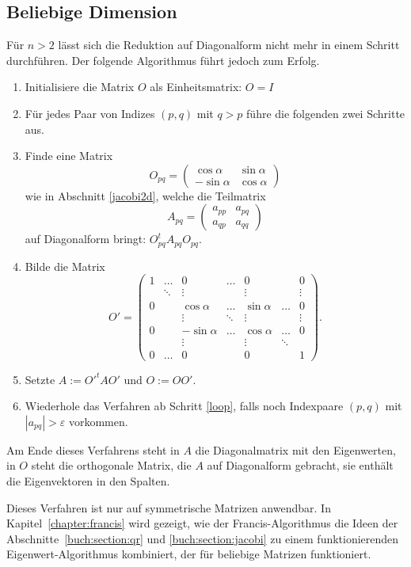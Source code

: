 \subsection{Beliebige Dimension}
Für $n>2$ lässt sich die Reduktion auf Diagonalform nicht mehr in einem
Schritt durchführen. Der folgende Algorithmus führt jedoch zum Erfolg.
\begin{enumerate}
\item Initialisiere die Matrix $O$ als Einheitsmatrix: $O=I$
\item \label{loop} Für jedes Paar von Indizes $(p,q)$ mit $q>p$ führe
die folgenden zwei Schritte aus.
\item Finde eine Matrix
\[
O_{pq}
=
\begin{pmatrix}
 \cos\alpha&\sin\alpha\\
-\sin\alpha&\cos\alpha
\end{pmatrix}
\]
wie in Abschnitt \ref{jacobi2d}, welche die Teilmatrix
\[
A_{pq}=\begin{pmatrix}a_{pp}&a_{pq}\\a_{qp}&a_{qq}\end{pmatrix}
\]
auf Diagonalform bringt: $O_{pq}^tA_{pq}O_{pq}$.
\item Bilde die Matrix
\[
O'=\begin{pmatrix}
1 &\dots &0         &\dots &0          &      &0\\
  &\ddots&\vdots    &      &\vdots     &      &\vdots\\
0 &      &\cos\alpha&\dots &\sin\alpha&\dots &0\\
  &      &\vdots    &\ddots&\vdots     &      &\vdots\\
0 &      &-\sin\alpha&\dots & \cos\alpha&\dots &0\\
  &      &\vdots    &      & \vdots    &\ddots& \\
0 &\dots &0         &      & 0         &      &1
\end{pmatrix}.
\]
\item Setzte $A:=O'^tAO'$ und $O:=OO'$.
\item Wiederhole das Verfahren ab Schritt \ref{loop}, falls noch Indexpaare
$(p,q)$ mit $|a_{pq}|>\varepsilon$ vorkommen.
\end{enumerate}
Am Ende dieses Verfahrens steht in $A$ die Diagonalmatrix mit den
Eigenwerten, in $O$ steht die orthogonale Matrix, die $A$ auf
Diagonalform gebracht, sie enthält die Eigenvektoren in den
Spalten.

Dieses Verfahren ist nur auf symmetrische Matrizen anwendbar.
In Kapitel~\ref{chapter:francis} wird gezeigt, wie der
Francis-Algorithmus die Ideen der Abschnitte~\ref{buch:section:qr}
und \ref{buch:section:jacobi} zu einem funktionierenden
Eigenwert-Algorithmus kombiniert, der für beliebige Matrizen funktioniert.




